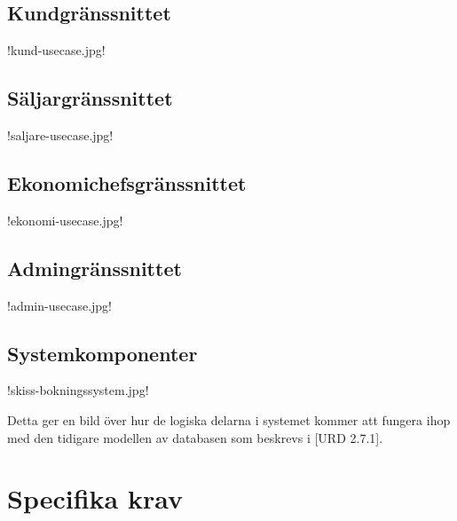 \documentclass[a4paper, twoside, 11pt, titlepage]{article}
\begin{document}
	\subsection{Kundgränssnittet}


	!kund-usecase.jpg!

	\subsection{Säljargränssnittet}


	!saljare-usecase.jpg!

	\subsection{Ekonomichefsgränssnittet}


	!ekonomi-usecase.jpg!

	\subsection{Admingränssnittet}


	!admin-usecase.jpg!

	\subsection{Systemkomponenter}


	!skiss-bokningssystem.jpg!

	Detta ger en bild över hur de logiska delarna i systemet kommer att fungera ihop med den tidigare modellen av databasen som beskrevs i [URD 2.7.1].

\clearpage
\section{Specifika krav}
\end{document}
